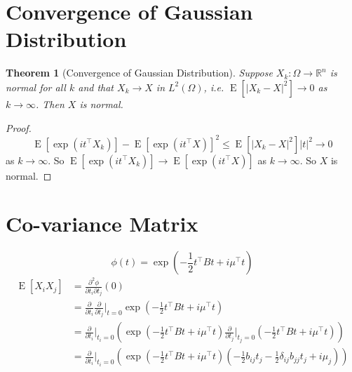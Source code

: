 \documentclass[12pt]{article}
\newtheorem{theorem}{Theorem}
\begin{document}
\section{Convergence of Gaussian Distribution}
\begin{theorem}[Convergence of Gaussian Distribution]
    Suppose $X_k:\Omega\rightarrow\mathbb{R}^n$ is normal for all $k$ and that $X_k\rightarrow X$ in $L^2(\Omega)$, i.e. $\operatorname{E}[|X_k-X|^2]\rightarrow 0$ as $k\rightarrow\infty$. Then $X$ is normal.
\end{theorem}
\begin{proof}
    $$\operatorname{E}[\exp(i t^{\top}X_k)]-\operatorname{E}[\exp(i t^{\top}X)]^2\le \operatorname{E}[|X_k-X|^2] |t|^2\rightarrow 0$$ as $k\rightarrow\infty$. So $\operatorname{E}[\exp(i t^{\top}X_k)]\rightarrow \operatorname{E}[\exp(i t^{\top}X)]$ as $k\rightarrow\infty$. So $X$ is normal.
\end{proof}

\section{Co-variance Matrix}
$$ \phi(t)=\exp\left(-\frac{1}{2}t^{\top}Bt+i\mu^{\top}t\right) $$
\begin{align}
    \operatorname{E}[X_i X_j]&=\frac{\partial^2 \phi}{\partial t_i \partial t_j}(0) \\
    &=\frac{\partial}{\partial t_i} \frac{\partial}{\partial t_j} \bigg|_{t=0} \exp \left(-\frac{1}{2} t^{\top} B t+i \mu^{\top} t\right) \\
    &=\frac{\partial}{\partial t_i} \bigg|_{t_i=0} \left( \exp \left(-\frac{1}{2} t^{\top} B t+i \mu^{\top} t\right) \frac{\partial}{\partial t_j}\bigg|_{t_j=0} \left(-\frac{1}{2} t^{\top} B t+i \mu^{\top} t\right) \right) \\
    &=\frac{\partial}{\partial t_i} \bigg|_{t_i=0} \left( \exp \left(-\frac{1}{2} t^{\top} B t+i \mu^{\top} t\right) \left(-\frac{1}{2} b_{ij} t_j - \frac{1}{2} \delta_{ij} b_{jj} t_j + i \mu_j \right) \right) \\
\end{align}
\end{document}
